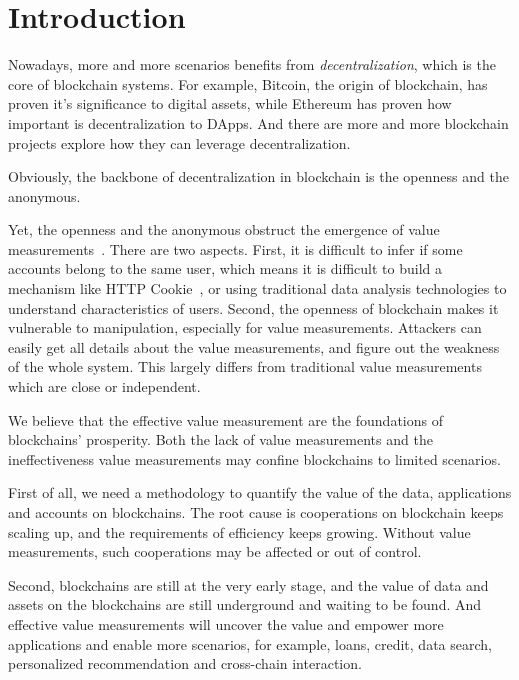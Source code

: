 
\section{Introduction}

Nowadays, more and more scenarios benefits from \emph{decentralization}, which
is the core of blockchain systems. For example, Bitcoin, the origin of
blockchain, has proven it's significance to digital assets, while Ethereum has
proven how important is decentralization to DApps. And there are more and more
blockchain projects explore how they can leverage decentralization.

Obviously, the backbone of decentralization in blockchain is the openness and the
anonymous.


Yet, the openness and the anonymous obstruct the emergence of value
measurements~\cite{meiklejohn2013fistful}. There are two aspects. First, it is
difficult to infer if some accounts belong to the same user, which means it is
difficult to build a mechanism like HTTP Cookie~\cite{Cookie}, or using
traditional data analysis technologies to understand characteristics of users.
Second, the openness of blockchain makes it vulnerable to manipulation,
especially for value measurements. Attackers can easily get all details about the
value measurements, and figure out the weakness of the whole system. This
largely differs from traditional value measurements which are close or
independent.

We believe that the effective value measurement are the foundations of
blockchains' prosperity. Both the lack of value measurements and the
ineffectiveness value measurements may confine blockchains to limited
scenarios.

First of all, we need a methodology to quantify the value of the data,
applications and accounts on blockchains. The root cause is cooperations on
blockchain keeps scaling up, and the requirements of efficiency
keeps growing. Without value measurements, such cooperations may be affected or
out of control.

Second, blockchains are still at the very early stage, and the value of data
and assets on the blockchains are still underground and waiting to be found.
And effective value measurements will uncover the value and empower more
applications and enable more scenarios, for example, loans, credit, data
search, personalized recommendation and cross-chain interaction.

